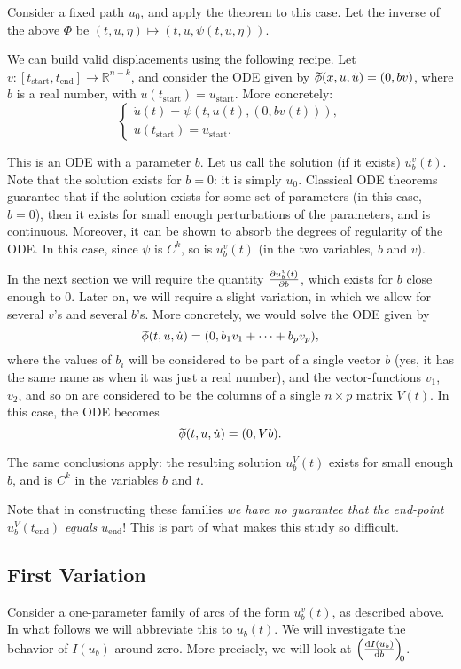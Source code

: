 \documentclass{article}
\theoremstyle{plain}
\theoremstyle{nonumberplain}
\newcommand{\R}{\mathbb{R}}
\newcommand{\tstart}{\mathrm{start}}
\newcommand{\tend}{\mathrm{end}}
\newcommand{\wtphi}{
  \mspace{2mu}
  \widetilde{\mspace{-2mu}\smash[t]{\phi}}
}
\begin{document}
Consider a fixed path $u_0$, and apply the theorem to this case. Let the inverse of the above $\Phi$ be $(t,u,\eta) \mapsto (t,u,\psi(t,u,\eta))$.

We can build valid displacements using the following recipe. Let $v \colon [t_\tstart, t_\tend] \to \R^{n-k}$, and consider the ODE given by $\wtphi(x,u,\dot u) = (0, b v)$, where $b$ is a real number, with $u(t_\tstart) = u_\tstart$. More concretely:
\[
\begin{cases}
\dot u(t) = \psi(t, u(t), (0, b v(t))),\\
u(t_\tstart) = u_\tstart.
\end{cases}
\]

This is an ODE with a parameter $b$. Let us call the solution (if it exists) $u_b^v(t)$. Note that the solution exists for $b = 0$: it is simply $u_0$. Classical ODE theorems guarantee that if the solution exists for some set of parameters (in this case, $b = 0$), then it exists for small enough perturbations of the parameters, and is continuous. Moreover, it can be shown to absorb the degrees of regularity of the ODE. In this case, since $\psi$ is $C^k$, so is $u_b^v(t)$ (in the two variables, $b$ and $v$).

In the next section we will require the quantity $\diffp{u_b^v(t)}b$, which exists for $b$ close enough to 0. Later on, we will require a slight variation, in which we allow for several $v$'s and several $b$'s. More concretely, we would solve the ODE given by
\[\wtphi(t,u,\dot u) = (0, b_1 v_1 + \dots + b_p v_p),\]
where the values of $b_i$ will be considered to be part of a single vector $b$ (yes, it has the same name as when it was just a real number), and the vector-functions $v_1$, $v_2$, and so on are considered to be the columns of a single $n \times p$ matrix $V(t)$. In this case, the ODE becomes
\[\wtphi(t,u,\dot u) = (0, V b).\]

The same conclusions apply: the resulting solution $u^V_b(t)$ exists for small enough $b$, and is $C^k$ in the variables $b$ and $t$.

Note that in constructing these families \emph{we have no guarantee that the end-point $u_b^V(t_\tend)$ equals $u_\tend$}! This is part of what makes this study so difficult.

\subsection{First Variation}

Consider a one-parameter family of arcs of the form $u_b^v(t)$, as described above. In what follows we will abbreviate this to $u_b(t)$. We will investigate the behavior of $I(u_b)$ around zero. More precisely, we will look at $\diff{I(u_b)}b[0]$.
\end{document}

